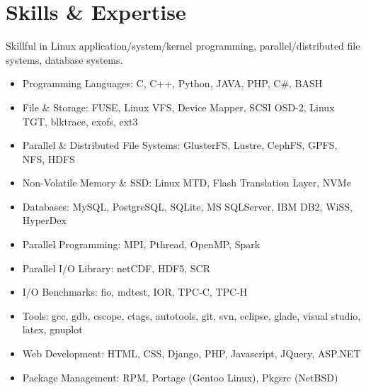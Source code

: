 \section{Skills \& Expertise}
Skillful in Linux application/system/kernel programming, parallel/distributed
file systems, database systems.
\begin{itemize}
\item {Programming Languages}: C, C++, Python, JAVA, PHP, C\#, BASH
\item {File \& Storage}: FUSE, Linux VFS, Device Mapper, SCSI OSD-2, Linux TGT, blktrace, exofs, ext3
\item {Parallel \& Distributed File Systems}: GlusterFS, Lustre, CephFS, GPFS, NFS, HDFS
\item {Non-Volatile Memory \& SSD}: Linux MTD, Flash Translation Layer, NVMe
\item {Databases}: MySQL, PostgreSQL, SQLite, MS SQLServer, IBM DB2, WiSS, HyperDex
\item {Parallel Programming}: MPI, Pthread, OpenMP, Spark
\item {Parallel I/O Library}: netCDF, HDF5, SCR
\item {I/O Benchmarks}: fio, mdtest, IOR, TPC-C, TPC-H
\item {Tools}: gcc, gdb, cscope, ctags, autotools, git, svn, eclipse, glade, visual studio, latex, gnuplot
\item {Web Development}: HTML, CSS, Django, PHP, Javascript, JQuery, ASP.NET
\item {Package Management}: RPM, Portage (Gentoo Linux), Pkgsrc (NetBSD)
\end{itemize}

